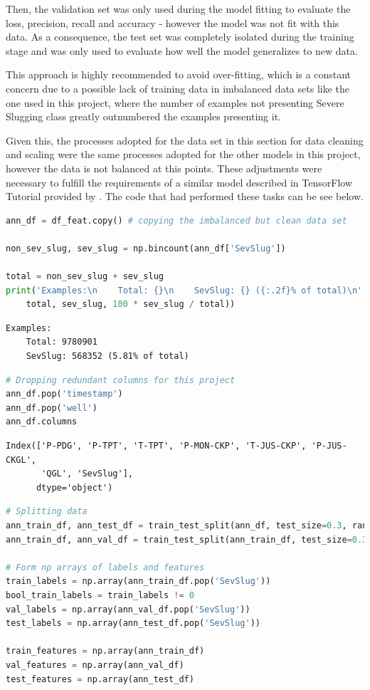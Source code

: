 \documentclass{article}
\begin{document}
Then, the validation set was only used during the model fitting to evaluate the loss, precision, recall and accuracy - however the model was not fit with this data. As a consequence, the test set was completely isolated during the training stage and was only used to evaluate how well the model generalizes to new data. 

This approach is highly recommended to avoid over-fitting, which is a constant concern due to a possible lack of training data in imbalanced data sets \parencite{tensorflow2015-whitepaper} like the one used in this project, where the number of examples not presenting Severe Slugging class greatly outnumbered the examples presenting it.

Given this, the processes adopted for the data set in this section for data cleaning and scaling were the same processes adopted for the other models in this project, however the data is not balanced at this points. These adjustments were necessary to fulfill the requirements of a similar model described in TensorFlow Tutorial provided by \textcite{tensorflow2015-whitepaper}. The code that had performed these tasks can be see below. 

\begin{lstlisting}[language=Python]
ann_df = df_feat.copy() # copying the imbalanced but clean data set

non_sev_slug, sev_slug = np.bincount(ann_df['SevSlug'])

total = non_sev_slug + sev_slug
print('Examples:\n    Total: {}\n    SevSlug: {} ({:.2f}% of total)\n'.format(
    total, sev_slug, 100 * sev_slug / total))
\end{lstlisting}
\begin{verbatim}
Examples:
    Total: 9780901
    SevSlug: 568352 (5.81% of total)
\end{verbatim}

\begin{lstlisting}[language=Python]
# Dropping redundant columns for this project
ann_df.pop('timestamp')
ann_df.pop('well')
ann_df.columns
\end{lstlisting}
\begin{verbatim}
Index(['P-PDG', 'P-TPT', 'T-TPT', 'P-MON-CKP', 'T-JUS-CKP', 'P-JUS-CKGL',
       'QGL', 'SevSlug'],
      dtype='object')
\end{verbatim}

\begin{lstlisting}[language=Python]
# Splitting data
ann_train_df, ann_test_df = train_test_split(ann_df, test_size=0.3, random_state=42)
ann_train_df, ann_val_df = train_test_split(ann_train_df, test_size=0.3)

# Form np arrays of labels and features
train_labels = np.array(ann_train_df.pop('SevSlug'))
bool_train_labels = train_labels != 0
val_labels = np.array(ann_val_df.pop('SevSlug'))
test_labels = np.array(ann_test_df.pop('SevSlug'))

train_features = np.array(ann_train_df)
val_features = np.array(ann_val_df)
test_features = np.array(ann_test_df)
\end{lstlisting}
\end{document}
